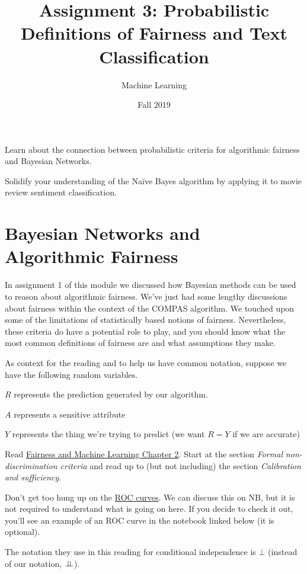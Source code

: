 \documentclass[assignment03_Solutions]{subfiles}
\title{Assignment 3: Probabilistic Definitions of Fairness and Text Classification}
\author{Machine Learning}
\date{Fall 2019}
\begin{document}
\maketitle
\thispagestyle{firstpage}


\begin{learningobjectives}
\bi
\item Learn about the connection between probabilistic criteria for algorithmic fairness and Bayesian Networks.
\item Solidify your understanding of the Na\"ive Bayes algorithm by applying it to movie review sentiment classification.
\ei
\end{learningobjectives}

\section{Bayesian Networks and Algorithmic Fairness}


In assignment 1 of this module we discussed how Bayesian methods can be used to reason about algorithmic fairness.  We've just had some lengthy discussions about fairness within the context of the COMPAS algorithm.  We touched upon some of the limitations of statistically based notions of fairness.  Nevertheless, these criteria do have a potential role to play, and you should know what the most common definitions of fairness are and what assumptions they make.

As context for the reading and to help us have common notation, suppose we have the following random variables.

\bi
\item $R$ represents the prediction generated by our algorithm.
\item $A$ represents a sensitive attribute
\item $Y$ represents the thing we're trying to predict (we want $R = Y$ if we are accurate)
\ei

\begin{externalresources}[(40 minutes)]
Read \href{https://fairmlbook.org/classification.html}{Fairness and Machine Learning Chapter 2}.  Start at the section \emph{Formal non-discrimination criteria} and read up to (but not including) the section \emph{Calibration and sufficiency}.
\begin{notice}
\bi
\item Don't get too hung up on the \href{https://en.wikipedia.org/wiki/Receiver_operating_characteristic}{ROC curves}.  We can discuss this on NB, but it is not required to understand what is going on here.  If you decide to check it out, you'll see an example of an ROC curve in the notebook linked below (it is optional).
\item The notation they use in this reading for conditional independence is $\bot$ (instead of our notation, $\perp\!\!\!\perp$).
\ei
\end{notice}
\end{externalresources}
\end{document}
